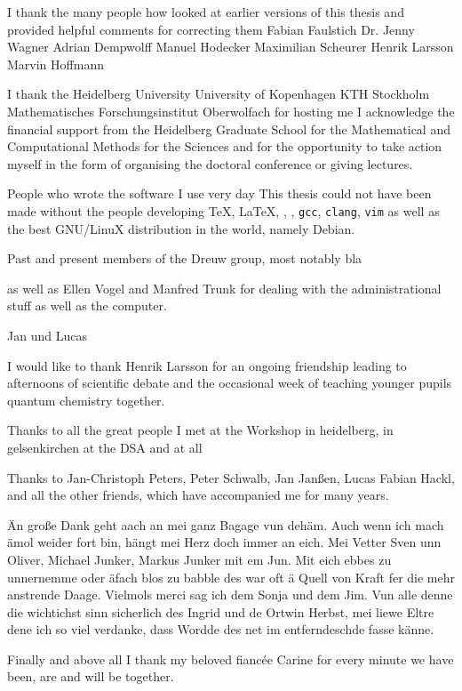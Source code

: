 I thank the many people how looked at earlier versions
of this thesis and provided helpful comments for correcting them
Fabian Faulstich
Dr. Jenny Wagner
Adrian Dempwolff
Manuel Hodecker
Maximilian Scheurer
Henrik Larsson
Marvin Hoffmann 


I thank the 
Heidelberg University
University of Kopenhagen
KTH Stockholm
Mathematisches Forschungsinstitut Oberwolfach
for hosting me
I acknowledge the
financial support from the Heidelberg Graduate School
for the Mathematical and Computational Methods for the Sciences
and for the opportunity to take action myself
in the form of organising
the doctoral conference or giving lectures.

People who wrote the software I use very day
This thesis could not have been made without the people
developing \TeX, \LaTeX, \python, \numpy, \texttt{gcc}, \texttt{clang}, \texttt{vim}
as well as the best GNU/LinuX distribution in the world,
namely Debian.

Past and present members of the Dreuw group,
most notably bla

as well as Ellen Vogel and Manfred Trunk for dealing with the
administrational stuff as well as the computer.

Jan und Lucas

I would like to thank Henrik Larsson
for an ongoing friendship leading to afternoons of scientific
debate
and the occasional week of teaching younger pupils
quantum chemistry together.

Thanks to all the great people I met
at the Workshop in heidelberg,
in gelsenkirchen
at the DSA and at all 

Thanks to Jan-Christoph Peters, Peter Schwalb,
Jan Janßen, Lucas Fabian Hackl,
and all the other friends, which have accompanied me for many years.


Än große Dank geht aach an mei ganz Bagage vun dehäm.
Auch wenn ich  mach ämol weider fort bin,
hängt mei Herz doch immer an eich.
Mei Vetter Sven unn Oliver,
Michael Junker, Markus Junker mit em Jun.
Mit eich ebbes zu unnernemme oder äfach blos zu babble
des war oft ä Quell von Kraft fer die mehr anstrende Daage.
Vielmols merci sag ich dem Sonja und dem Jim.
Vun alle denne die wichtichst
sinn sicherlich des Ingrid und de Ortwin Herbst,
mei liewe Eltre dene ich so viel verdanke,
dass Wordde des net im entferndeschde fasse känne.

Finally and above all I thank my beloved fianc\'ee Carine
for every minute we have been, are and will be together.
